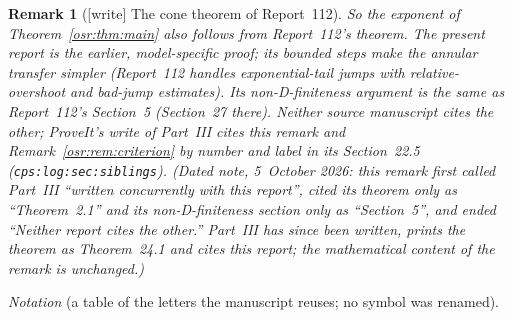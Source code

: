 \documentclass[11pt,letterpaper]{article}
\newtheorem{remark}[theorem]{Remark}
\numberwithin{equation}{section}
\begin{document}
\begin{remark}[{[write]} The cone theorem of Report~112]
So the exponent of Theorem~\ref{osr:thm:main} also follows from Report~112's
theorem. The present report is the earlier, model-specific proof; its bounded
steps make the annular transfer simpler (Report~112 handles exponential-tail
jumps with relative-overshoot and bad-jump estimates). Its non-D-finiteness
argument is the same as Report~112's Section~5 (Section~27 there). Neither
source manuscript cites the other; ProveIt's write of Part~III cites this
remark and Remark~\ref{osr:rem:criterion} by number and label in its
Section~22.5 (\nolinkurl{cps:log:sec:siblings}). (Dated note, 5~October
2026: this remark first called Part~III ``written concurrently with this
report'', cited its theorem only as ``Theorem~2.1'' and its
non-D-finiteness section only as ``Section~5'', and ended ``Neither report
cites the other.'' Part~III has since been written, prints the theorem as
Theorem~24.1 and cites this report; the mathematical content of the remark
is unchanged.)
\end{remark}

\emph{Notation} (a table of the letters the manuscript reuses; no symbol
was renamed).
\end{document}
